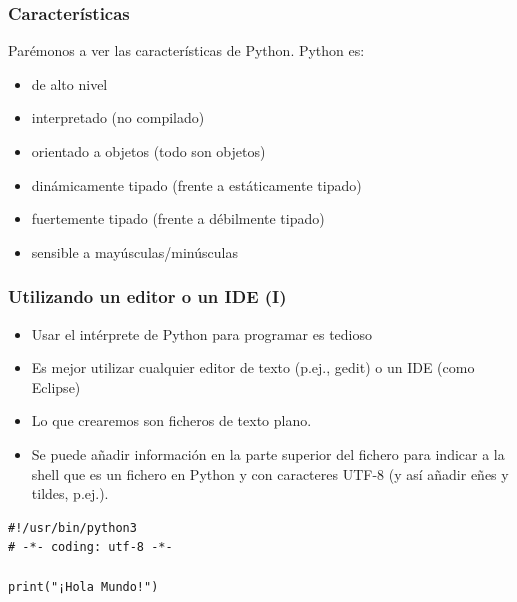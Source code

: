 \documentclass{beamer}
\begin{document}
\begin{frame}
\frametitle{Características}

Parémonos a ver las características de Python. Python es:
\begin{itemize}
\item de alto nivel
\item interpretado (no compilado)
\item orientado a objetos (todo son objetos)
\item dinámicamente tipado (frente a estáticamente tipado)
\item fuertemente tipado (frente a débilmente tipado)
\item sensible a mayúsculas/minúsculas
\end{itemize}

\end{frame}



\begin{frame}[fragile]
\frametitle{Utilizando un editor o un IDE (I)}

\begin{itemize}
  \item Usar el intérprete de Python para programar es tedioso
  \item Es mejor utilizar cualquier editor de texto (p.ej., gedit) o un IDE (como Eclipse)
  \item Lo que crearemos son ficheros de texto plano.
  \item Se puede añadir información en la parte superior del fichero para indicar a la shell que es un fichero en Python y con caracteres UTF-8 (y así añadir eñes y tildes, p.ej.).
\end{itemize}

\begin{footnotesize}
\begin{verbatim}
#!/usr/bin/python3
# -*- coding: utf-8 -*-

print("¡Hola Mundo!")

\end{verbatim}
\end{footnotesize}

\end{frame}
\end{document}
